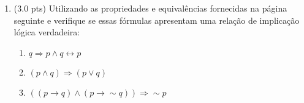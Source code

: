 \documentclass[12pt]{article}
\begin{document}
\begin{enumerate}
\item (3.0 pts) Utilizando as propriedades e equivalências
fornecidas na página seguinte
e verifique  se essas fórmulas apresentam uma relaç\~ao de implicaç\~ao lógica  verdadeira:



\begin{enumerate}
\setlength{\itemsep}{-2pt}



\item $q \Rightarrow p \wedge q \leftrightarrow p$

\item $(p \wedge q) \Rightarrow (p \vee q)$









\item $((p \rightarrow q) \wedge (p \rightarrow \sim q))  \Rightarrow  \sim p$


\end{enumerate}
\end{enumerate}
\end{document}
